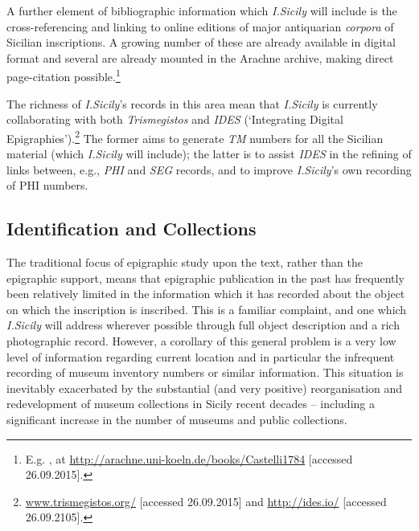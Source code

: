 \documentclass[amsthm,ebook]{saparticle}
\begin{document}
A further element of bibliographic information which \emph{I.Sicily} will include is the cross-referencing and linking to
online editions of major antiquarian \emph{corpora} of Sicilian inscriptions. A growing number of these are already available
in digital format and several are already mounted in the Arachne archive, making direct page-citation
possible.\footnote{ E.g. \citet{Castelli:1784aa}, at \url{http://arachne.uni-koeln.de/books/Castelli1784} [accessed 26.09.2015].}

The richness of \emph{I.Sicily}’s records in this area mean that \emph{I.Sicily} is currently collaborating with both \emph{Trismegistos} and
\emph{IDES} (`Integrating Digital Epigraphies').\footnote{\url{www.trismegistos.org/} [accessed 26.09.2015] and \url{http://ides.io/}
[accessed 26.09.2105].} The former aims to generate \emph{TM} numbers for all the Sicilian material (which \emph{I.Sicily} will
include); the latter is to assist \emph{IDES} in the refining of links between, e.g., \emph{PHI} and \emph{SEG} records, and to improve
\emph{I.Sicily}’s own recording of PHI numbers.




\subsection{Identification and Collections}


\noindent The traditional focus of epigraphic study upon the text, rather than the epigraphic support, means that epigraphic
publication in the past has frequently been relatively limited in the information which it has recorded about the
object on which the inscription is inscribed. This is a familiar complaint, and one which \emph{I.Sicily} will address
wherever possible through full object description and a rich photographic record. However, a corollary of this general
problem is a very low level of information regarding current location and in particular the infrequent recording of
museum inventory numbers or similar information. This situation is inevitably exacerbated by the substantial (and very
positive) reorganisation and redevelopment of museum collections in Sicily recent decades – including a significant
increase in the number of museums and public collections.
\end{document}
